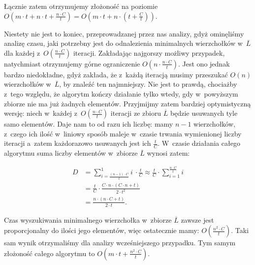Łącznie zatem otrzymujemy złożoność na poziomie $ O \left( m \cdot t + n \cdot t + \frac{n \cdot C}{t} \right) = O \left( m \cdot t + n \cdot \left( t + \frac{C}{t}\right) \right)$.

Niestety nie jest to koniec, przeprowadzanej przez nas analizy, gdyż ominęliśmy analizę czasu, jaki potrzebny jest do odnalezienia minimalnych wierzchołków w~$\overline{L}$ dla każdej z~$ O \left( \frac{n \cdot C}{t}\right)$ iteracji. Zakładając najgorszy możliwy przypadek, natychmiast otrzymujemy górne ograniczenie $O \left( n \cdot \frac{n \cdot C}{t} \right)$. Jest ono jednak bardzo niedokładne, gdyż zakłada, że z~każdą iteracją musimy przeszukać $O \left( n \right)$ wierzchołków w~$\overline{L}$, by znaleźć ten najmniejszy. Nie jest to prawdą, chociażby z~tego względu, że algorytm kończy działanie tylko wtedy, gdy w~powyższym zbiorze nie ma już żadnych elementów. Przyjmijmy zatem bardziej optymistyczną wersję: niech w~każdej z~$ O \left( \frac{n \cdot C}{t}\right)$ iteracji ze zbioru $\overline{L}$ będzie usuwanych tyle samo elementów. Daje nam to od razu ich liczbę: mamy $n-1$ wierzchołków, z~czego ich ilość w~liniowy sposób maleje w~czasie trwania wymienionej liczby iteracji a~zatem każdorazowo usuwanych jest ich $\frac{t}{C}$. W~czasie działania całego algorytmu suma liczby elementów w~zbiorze $\overline{L}$ wynosi zatem: 

\begin{equation}
	\begin{aligned}
		D &= \sum_{i=\frac{ \left( n-1 \right) \cdot C}{t}}^{1} i~\cdot \frac{t}{C} \approx \frac{t}{C} \cdot \sum_{i=1}^{\frac{n \cdot C}{t}} i\\
		&= \frac{t}{C} \cdot \frac{C \cdot n \cdot \left( C \cdot n + t \right)}{2 \cdot t^{2}} \\
		&= \frac{n \cdot \left( n \cdot C + t \right)}{2 \cdot t}.
	\end{aligned}
\end{equation}

Czas wyszukiwania minimalnego wierzchołka w~zbiorze $\overline{L}$ zawsze jest proporcjonalny do ilości jego elementów, więc ostatecznie mamy: $ O \left( \frac{n^{2} \cdot C}{t}\right)$. Taki sam wynik otrzymaliśmy dla analizy wcześniejszego przypadku. Tym samym złożoność całego algorytmu to $ O \left( m \cdot t + \frac{n^{2} \cdot C}{t}\right)$.

